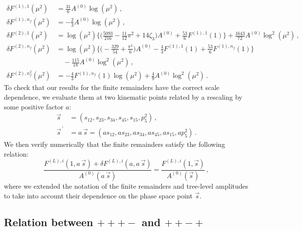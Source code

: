 \documentclass[main.tex]{subfiles}
\begin{document}
\begin{align}
\delta F^{(1),1}(\mu^2)   & =  \frac{31}{6} A^{(0)} \log(\mu^2) \,, \\
\delta F^{(1),n_f}(\mu^2) & =  - \frac{2}{3} A^{(0)} \log(\mu^2) \,, \\
\delta F^{(2),1}(\mu^2) & = \log(\mu^2) \bigg\lbrace \bigg(\frac{5093}{216} - \frac{11}{12}\pi^2 + 14 \zeta_3\bigg) A^{(0)} 
                              + \frac{53}{6}F^{(1),1}(1) \bigg\rbrace  + \frac{1643}{72} A^{(0)} \log^2(\mu^2)  \,, \\
\delta F^{(2),n_f}(\mu^2) & = \log(\mu^2) \bigg\lbrace \bigg(-\frac{329}{54} + \frac{\pi^2}{6} \bigg) A^{(0)} 
                               - \frac{4}{3}F^{(1),1}(1)  + \frac{53}{6}F^{(1),n_f}(1) \bigg\rbrace \nonumber  \\
                            & \quad - \frac{115}{18} A^{(0)} \log^2(\mu^2) \,, \\
\delta F^{(2),n_f^2}(\mu^2) & = - \frac{4}{3} F^{(1),n_f}(1) \log(\mu^2) + \frac{4}{9} A^{(0)} \log^2(\mu^2) \, . 
\end{align}
\endgroup
To check that our results for the finite remainders have the correct scale dependence, we evaluate them at two kinematic points related by a rescaling by some positive factor $a$:
\begin{equation}
\begin{aligned}
\vec{s} &= (s_{12},s_{23},s_{34},s_{45},s_{15},p_5^2) \,,  \\ 
\vec{s}^{\,'} &= a \, \vec{s} = (a s_{12},a s_{23},a s_{34},a s_{45},a s_{15},a p_5^2) \,. 
\end{aligned}
\end{equation}
We then verify numerically that the finite remainders satisfy the following relation:
\begin{equation} \label{eq:Hbbscalingrel}
  \frac{F^{(L),i}(1,a \, \vec{s})+\delta F^{(L),i}(a,a \, \vec{s})}{A^{(0)}(a\,\vec{s})} 
= \frac{F^{(L),i}(1,\vec{s})}{A^{(0)}(\vec{s})} \,,
\end{equation}
where we extended the notation of the finite remainders and tree-level amplitudes to take into account their dependence on the phase space point $\vec{s}$.


\subsection{Relation between $+++-$ and $++-+$} 
\end{document}
